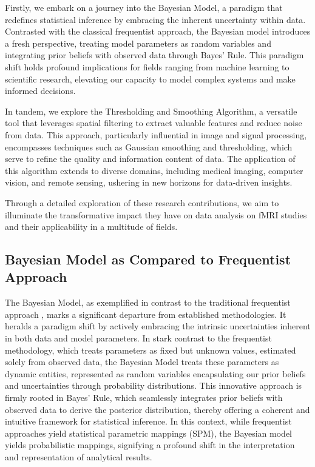 Firstly, we embark on a journey into the Bayesian Model, a paradigm that redefines statistical inference by embracing the inherent uncertainty within data. Contrasted with the classical frequentist approach, the Bayesian model introduces a fresh perspective, treating model parameters as random variables and integrating prior beliefs with observed data through Bayes' Rule. This paradigm shift holds profound implications for fields ranging from machine learning to scientific research, elevating our capacity to model complex systems and make informed decisions.

In tandem, we explore the Thresholding and Smoothing Algorithm, a versatile tool that leverages spatial filtering to extract valuable features and reduce noise from data. This approach, particularly influential in image and signal processing, encompasses techniques such as Gaussian smoothing and thresholding, which serve to refine the quality and information content of data. The application of this algorithm extends to diverse domains, including medical imaging, computer vision, and remote sensing, ushering in new horizons for data-driven insights.

Through a detailed exploration of these research contributions, we aim to illuminate the transformative impact they have on data analysis on fMRI studies and their applicability in a multitude of fields.

\subsection{Bayesian Model as Compared to Frequentist Approach}

The Bayesian Model, as exemplified in contrast to the traditional frequentist approach \cite{almodovar2019fast}, marks a significant departure from established methodologies. It heralds a paradigm shift by actively embracing the intrinsic uncertainties inherent in both data and model parameters. In stark contrast to the frequentist methodology, which treats parameters as fixed but unknown values, estimated solely from observed data, the Bayesian Model treats these parameters as dynamic entities, represented as random variables encapsulating our prior beliefs and uncertainties through probability distributions. This innovative approach is firmly rooted in Bayes' Rule, which seamlessly integrates prior beliefs with observed data to derive the posterior distribution, thereby offering a coherent and intuitive framework for statistical inference. In this context, while frequentist approaches yield statistical parametric mappings (SPM), the Bayesian model yields probabilistic mappings, signifying a profound shift in the interpretation and representation of analytical results.

